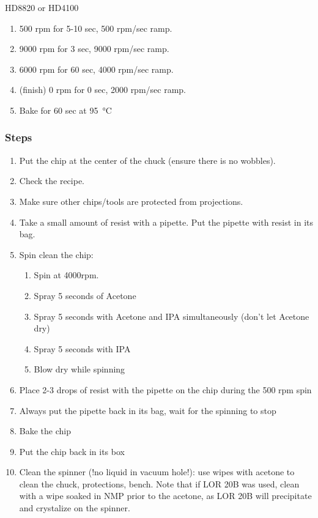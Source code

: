 \begin{description}
\begin{enumerate}
  \end{enumerate}
\item {HD8820 or HD4100}
  \begin{enumerate}
  \item 500 rpm for 5-10 sec, 500 rpm/sec ramp.
  \item 9000 rpm for 3 sec, 9000 rpm/sec ramp.
  \item 6000 rpm for 60 sec, 4000 rpm/sec ramp.
  \item (finish) 0 rpm for 0 sec, 2000 rpm/sec ramp.
  \item Bake for 60 sec at \SI{95}{\celsius}
  \end{enumerate}
\end{description}

\subsubsection{Steps}
\begin{enumerate}
\item Put the chip at the center of the chuck (ensure there is no wobbles).
\item Check the recipe.
\item Make sure other chips/tools are protected from projections.
\item Take a small amount of resist with a pipette. Put the pipette with resist in its bag.
\item Spin clean the chip:
\begin{enumerate}
\item Spin at 4000rpm.
\item Spray 5 seconds of Acetone
\item Spray 5 seconds with Acetone and IPA simultaneously (don't let Acetone dry)
\item Spray 5 seconds with IPA
\item Blow dry while spinning
\end{enumerate}
\item Place 2-3 drops of resist with the pipette on the chip during the 500 rpm spin
\item Always put the pipette back in its bag, wait for the spinning to stop
\item Bake the chip
\item Put the chip back in its box
\item Clean the spinner (!no liquid in vacuum hole!): use wipes with acetone to clean the chuck, protections, bench. Note that if LOR 20B was used, clean with a wipe soaked in NMP prior to the acetone, as LOR 20B will precipitate and crystalize on the spinner.
\end{enumerate}

